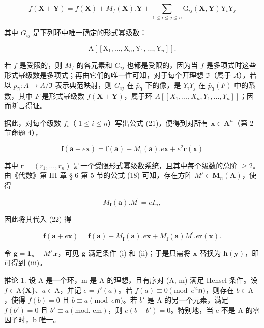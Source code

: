 \[
f (\mathbf {X} + \mathbf {Y}) = f (\mathbf {X}) + M _ {f} (\mathbf {X}). \mathbf {Y} + \sum_ {1 \leqslant i \leqslant j \leqslant n} \mathrm{G} _ {i j} (\mathbf {X}, \mathbf {Y}) \mathrm{Y} _ {i} \mathrm{Y} _ {j}\tag{21}
\]

其中 \(G_{ij}\) 是下列环中唯一确定的形式幂级数：

\[
\mathrm{A} \left[ \left[ \mathrm{X} _ {1}, \dots , \mathrm{X} _ {n}, \mathrm{Y} _ {1}, \dots , \mathrm{Y} _ {n} \right] \right].
\]

若 \(f\) 是受限的，则 \(M_{f}\) 的各元素和 \(G_{ij}\) 也都是受限的，因为当 \(f\) 是多项式时这些形式幂级数是多项式；再由它们的唯一性可知，对于每个开理想 \(\Im\)（属于 \(A\)），若以 \(p_{\Im} \colon A \to A / \Im\) 表示典范映射，则 \(G_{ij}\) 在 \(\bar{p}_{\Im}\) 下的像，是 \(Y_{i}Y_{j}\) 在 \(\bar{p}_{\Im}(F)\) 中的系数，其中 \(F\) 是形式幂级数 \(f(\mathbf{X} + \mathbf{Y})\)，属于环 \(A[[X_1, \ldots, X_n, Y_1, \ldots, Y_n]]\)；因而断言得证。

据此，对每个级数 \(f_{i}\)（ \(1 \leqslant i \leqslant n\)）写出公式 (21)，便得到对所有 \(\mathbf{x} \in \mathbf{A}^n\)（第 2 节命题 4），

\[
\mathbf {f} (\mathbf {a} + e \mathbf {x}) = \mathbf {f} (\mathbf {a}) + M _ {\mathbf {f}} (\mathbf {a}). e \mathbf {x} + e ^ {2} \mathbf {r} (\mathbf {x})\tag{22}
\]

其中 \(\mathbf{r} = (r_1, \ldots, r_n)\) 是一个受限形式幂级数系统，且其中每个级数的总阶 \(\geqslant 2\)。由《代数》第 III 章 § 6 第 5 节的公式 (18) 可知，存在方阵 \(M' \in \mathbf{M}_n(\mathbf{A})\)，使得

\[
M _ {\mathbf {f}} (\mathbf {a}). M ^ {\prime} = e I _ {n},\tag{23}
\]

因此将其代入 (22) 得

\[
\mathbf {f} (\mathbf {a} + e \mathbf {x}) = \mathbf {f} (\mathbf {a}) + M _ {\mathbf {f}} (\mathbf {a}). e \mathbf {x} + M _ {\mathbf {f}} (\mathbf {a}) M ^ {\prime}. e \mathbf {r} (\mathbf {x}).\tag{24}
\]

令 \(\mathbf{g} = \mathbf{1}_n + M'.\mathbf{r}\)，可见 \(\mathbf{g}\) 满足条件 (i) 和 (ii)；于是只需将 \(\mathbf{x}\) 替换为 \(\mathbf{h}(\mathbf{y})\)，即可得到 (iii)。

推论 1. 设 A 是一个环，m 是 A 的理想，且有序对 (A, m) 满足 Hensel 条件。设 \(f \in \mathrm{A}\{\mathbf{X}\}\)、\(a \in \mathrm{A}\)，并记 \(e = f'(a)\)。若 \(f(a) \equiv 0 \pmod{e^2\mathfrak{m}}\)，则存在 \(b \in \mathrm{A}\)，使得 \(f(b) = 0\) 且 \(b \equiv a \pmod{e\mathfrak{m}}\)。若 \(b'\) 是 A 的另一个元素，满足 \(f(b') = 0\) 且 \(b' \equiv a (\text{mod. em})\)，则 \(e(b - b') = 0\)。特别地，当 e 不是 A 的零因子时，b 唯一。

